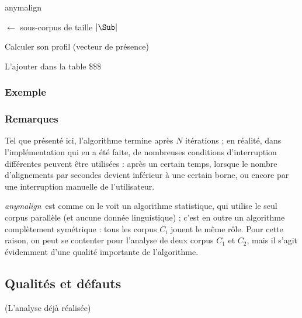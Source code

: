 \documentclass[a4paper,10pt]{article}
\newcommand{\anym}{\emph{anymalign}}
\begin{document}
\begin{algorithm}
\caption{anymalign \label{algoanym}}


\Debut
{
	{
		\Sub $\leftarrow$ sous-corpus de taille $|\Sub|$

		{
			{
				Calculer son profil (vecteur de présence)

				L'ajouter dans la table \$\$\$
			}
		}
	}
	\Retour \AlC
}
\end{algorithm}

\subsubsection{Exemple}

\subsubsection{Remarques}

Tel que présenté ici, l'algorithme termine après $N$ itérations ; en réalité, dans l'implémentation qui en a été faite, de nombreuses conditions d'interruption différentes peuvent être utilisées : après un certain temps, lorsque le nombre d'alignements par secondes devient inférieur à une certain borne, ou encore par une interruption manuelle de l'utilisateur.

\anym~est comme on le voit un algorithme statistique, qui utilise le seul corpus parallèle (et aucune donnée linguistique) ; c'est en outre un algorithme complètement symétrique : tous les corpus $C_i$ jouent le même rôle. Pour cette raison, on peut se contenter pour l'analyse de deux corpus $C_1$ et $C_2$, mais il s'agit évidemment d'une qualité importante de l'algorithme.


\subsection{Qualités et défauts}
(L'analyse déjà réalisée)
\end{document}
